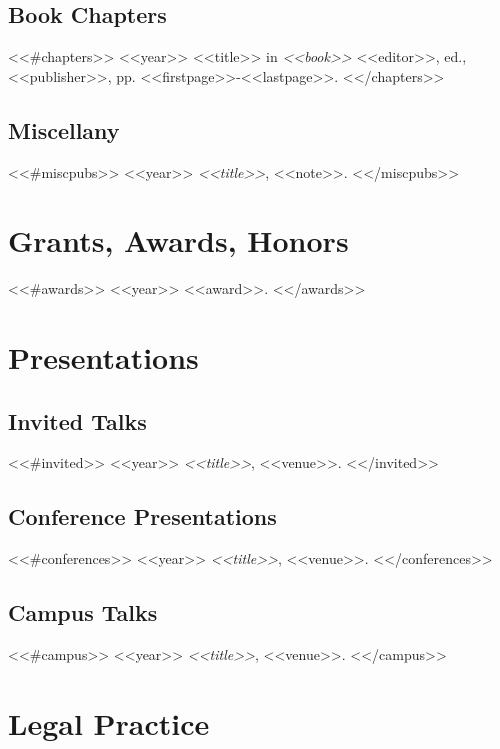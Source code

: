 \documentclass[letterpaper]{moderncv}
\begin{document}
\subsection{Book Chapters}
<<#chapters>>
\cventry
{<<year>>}
{<<title>>}
{}
{in \textit{<<book>>}}
{}
{<<editor>>, ed., <<publisher>>, pp. <<firstpage>>-<<lastpage>>.}
\vspace{1mm}
<</chapters>>
\vspace{1mm}

\subsection{Miscellany}
<<#miscpubs>>
\cvitem
{<<year>>}
{\textit{<<title>>}, <<note>>.}
\vspace{1mm}
<</miscpubs>>


\section{Grants, Awards, Honors}
<<#awards>>
\cvitem
{<<year>>}
{<<award>>.}
\vspace{1mm}
<</awards>>


\section{Presentations}
\subsection{Invited Talks}
<<#invited>>
\cvitem
{<<year>>}
{\textit{<<title>>}, <<venue>>.}
\vspace{1mm}
<</invited>>
\subsection{Conference Presentations}
<<#conferences>>
\cvitem
{<<year>>}
{\textit{<<title>>}, <<venue>>.}
\vspace{1mm}
<</conferences>>
\subsection{Campus Talks}
<<#campus>>
\cvitem
{<<year>>}
{\textit{<<title>>}, <<venue>>.}
\vspace{1mm}
<</campus>>

\section{Legal Practice}
\end{document}
